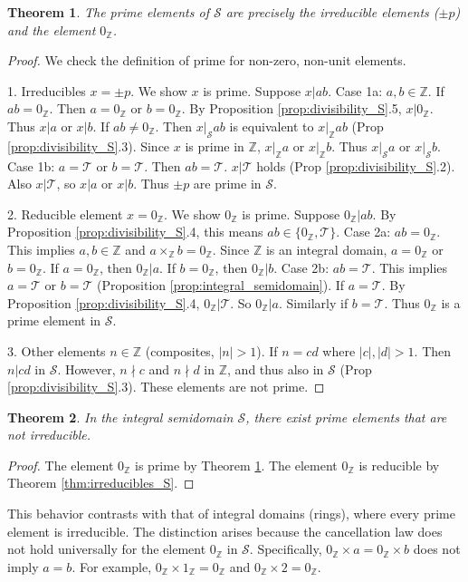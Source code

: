 \documentclass[11pt, a4paper]{article}
\theoremstyle{plain}
\newtheorem{theorem}{Theorem}[section]
\theoremstyle{definition}
\numberwithin{equation}{section}
\newcommand{\Z}{\mathbb{Z}}
\newcommand{\Tobj}{\mathcal{T}} %
\newcommand{\SemiringS}{\mathcal{S}}
\begin{document}
\begin{theorem}\label{thm:primes_S}
The prime elements of $\SemiringS$ are precisely the irreducible elements ($\pm p$) and the element $0_{\Z}$.
\end{theorem}
\begin{proof}
We check the definition of prime for non-zero, non-unit elements.

1. Irreducibles $x=\pm p$. We show $x$ is prime. Suppose $x|ab$.
Case 1a: $a, b \in \Z$.
If $ab=0_{\Z}$. Then $a=0_{\Z}$ or $b=0_{\Z}$. By Proposition \ref{prop:divisibility_S}.5, $x|0_{\Z}$. Thus $x|a$ or $x|b$.
If $ab\neq 0_{\Z}$. Then $x|_{\SemiringS} ab$ is equivalent to $x|_{\Z} ab$ (Prop \ref{prop:divisibility_S}.3). Since $x$ is prime in $\Z$, $x|_{\Z} a$ or $x|_{\Z} b$. Thus $x|_{\SemiringS} a$ or $x|_{\SemiringS} b$.
Case 1b: $a=\Tobj$ or $b=\Tobj$. Then $ab=\Tobj$. $x|\Tobj$ holds (Prop \ref{prop:divisibility_S}.2). Also $x|\Tobj$, so $x|a$ or $x|b$.
Thus $\pm p$ are prime in $\SemiringS$.

2. Reducible element $x=0_{\Z}$. We show $0_{\Z}$ is prime. Suppose $0_{\Z}|ab$.
By Proposition \ref{prop:divisibility_S}.4, this means $ab \in \{0_{\Z}, \Tobj\}$.
Case 2a: $ab=0_{\Z}$. This implies $a, b \in \Z$ and $a\times_{\Z} b = 0_{\Z}$. Since $\Z$ is an integral domain, $a=0_{\Z}$ or $b=0_{\Z}$.
If $a=0_{\Z}$, then $0_{\Z}|a$. If $b=0_{\Z}$, then $0_{\Z}|b$.
Case 2b: $ab=\Tobj$. This implies $a=\Tobj$ or $b=\Tobj$ (Proposition \ref{prop:integral_semidomain}).
If $a=\Tobj$. By Proposition \ref{prop:divisibility_S}.4, $0_{\Z}|\Tobj$. So $0_{\Z}|a$. Similarly if $b=\Tobj$.
Thus $0_{\Z}$ is a prime element in $\SemiringS$.

3. Other elements $n \in \Z$ (composites, $|n|>1$). If $n=cd$ where $|c|, |d| > 1$. Then $n|cd$ in $\SemiringS$. However, $n\nmid c$ and $n\nmid d$ in $\Z$, and thus also in $\SemiringS$ (Prop \ref{prop:divisibility_S}.3). These elements are not prime.
\end{proof}

\begin{theorem}\label{thm:prime_not_irreducible_S}
In the integral semidomain $\SemiringS$, there exist prime elements that are not irreducible.
\end{theorem}
\begin{proof}
The element $0_{\Z}$ is prime by Theorem \ref{thm:primes_S}. The element $0_{\Z}$ is reducible by Theorem \ref{thm:irreducibles_S}.
\end{proof}

This behavior contrasts with that of integral domains (rings), where every prime element is irreducible. The distinction arises because the cancellation law does not hold universally for the element $0_{\Z}$ in $\SemiringS$. Specifically, $0_{\Z}\times a = 0_{\Z}\times b$ does not imply $a=b$. For example, $0_{\Z}\times 1_{\Z} = 0_{\Z}$ and $0_{\Z}\times 2 = 0_{\Z}$.
\end{document}
